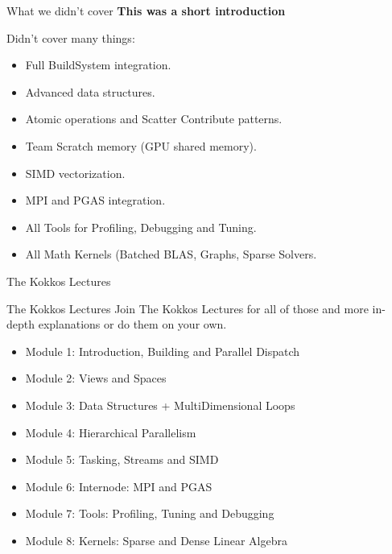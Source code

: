 \begin{frame}[fragile]{What we didn't cover}
	\textbf{This was a short introduction}
	
	Didn't cover many things:
	\begin{itemize}
		\item<2-> Full BuildSystem integration.
		\item<3-> Advanced data structures.
		\item<4-> Atomic operations and Scatter Contribute patterns.
		\item<5-> Team Scratch memory (GPU shared memory).
		\item<6-> SIMD vectorization.
		\item<7-> MPI and PGAS integration.
		\item<8-> All Tools for Profiling, Debugging and Tuning.
    \item<9-> All Math Kernels (Batched BLAS, Graphs, Sparse Solvers.
	\end{itemize}

\end{frame}

\begin{frame}{The Kokkos Lectures}
        
	\begin{block}{The Kokkos Lectures}
		Join The Kokkos Lectures for all of those and more in-depth explanations or do them on your own.
	\end{block}

\begin{itemize}
	\item Module 1: Introduction, Building and Parallel Dispatch
	\item Module 2: Views and Spaces
	\item Module 3: Data Structures + MultiDimensional Loops
	\item Module 4: Hierarchical Parallelism
	\item Module 5: Tasking, Streams and SIMD
	\item Module 6: Internode: MPI and PGAS
	\item Module 7: Tools: Profiling, Tuning and Debugging
	\item Module 8: Kernels: Sparse and Dense Linear Algebra
\end{itemize}
\end{frame}

